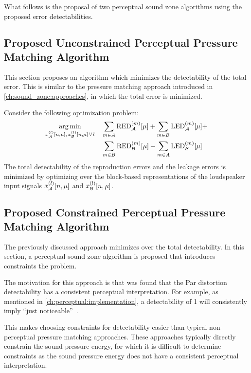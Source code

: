What follows is the proposal of two perceptual sound zone algorithms using the proposed error detectabilities.

\subsection{Proposed Unconstrained Perceptual Pressure Matching Algorithm}
\label{ch:perceptual_sound_zone:perceptual_minimization:unconstrained}
This section proposes an algorithm which minimizes the detectability of the total error.
This is similar to the pressure matching approach introduced in \autoref{ch:sound_zone:approaches}, 
in which the total error is minimized.

Consider the following optimization problem:
\begin{equation}
    \begin{aligned}
    \argmin{\tilde{x}_\za^{(l)}[n,\mu],\,\tilde{x}_\zb^{(l)}[n,\mu]\,\forall\,l}{
       & \sum_{m\in A}\text{RED}_\za^{(m)}[\mu] + \sum_{m\in B}\text{LED}_\za^{(m)}[\mu] +\\
       & \sum_{m\in B}\text{RED}_\zb^{(m)}[\mu] + \sum_{m\in A}\text{LED}_\zb^{(m)}[\mu]
    }
    \end{aligned}
\end{equation}
The total detectability of the reproduction errors and the leakage errors is minimized by optimizing over the 
block-based representations of the loudspeaker input signals $\tilde{x}_{\mathcal{A}}^{(l)}[n,\mu]$ and $\tilde{x}_{\mathcal{B}}^{(l)}[n,\mu]$.

\subsection{Proposed Constrained Perceptual Pressure Matching Algorithm}
\label{ch:perceptual_sound_zone:perceptual_minimization:constrained}
The previously discussed approach minimizes over the total detectability.
In this section, a perceptual sound zone algorithm is proposed that introduces constraints the problem. 

The motivation for this approach is that was found that the Par distortion detectability has a consistent perceptual interpretation.
For example, as mentioned in \autoref{ch:perceptual:implementation}, a detectability of 1 will consistently imply ``just noticeable''~\cite{van2005perceptual}.

This makes choosing constraints for detectability easier than typical non-perceptual pressure matching approaches.
These approaches typically directly constrain the sound pressure energy,
for which it is difficult to determine constraints as the sound pressure energy does not have a consistent perceptual interpretation.

